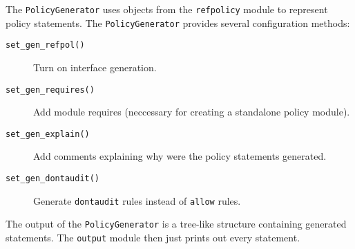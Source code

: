 The \texttt{PolicyGenerator} uses objects from the \texttt{refpolicy} module to
represent policy statements. The \texttt{PolicyGenerator} provides several
configuration methods:
\begin{description}
    \item [\texttt{set\_gen\_refpol()}] Turn on interface generation.
    \item [\texttt{set\_gen\_requires()}] Add module requires (neccessary for
        creating a standalone policy module).
    \item [\texttt{set\_gen\_explain()}] Add comments explaining why were the
        policy statements generated.
    \item [\texttt{set\_gen\_dontaudit()}] Generate \texttt{dontaudit} rules
        instead of \texttt{allow} rules.
\end{description}
The output of the \texttt{PolicyGenerator} is a tree-like structure containing
generated statements. The \texttt{output} module then just prints out every
statement.

